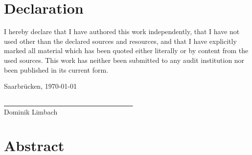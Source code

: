 \documentclass[
    12pt,
    a4paper,
	chapterprefix=false,
	parskip=full,
	headings=normal,
	numbers=noenddot
]{scrreprt}
\begin{document}
%
%	
%	
%	
%

\newpage

\chapter*{Declaration}

I hereby declare that I have authored this work independently, that I have not used other than the declared sources and resources, and that I have explicitly marked all material which has been quoted either literally or by content from the used sources. This work has neither been submitted to any audit institution nor been published in its current form.\\

\vspace{1cm}

Saarbrücken, \today\\

\vspace{1.5cm}

\underline{~ ~ ~ ~ ~ ~ ~ ~ ~ ~ ~ ~ ~ ~ ~ ~ ~ ~ ~ ~ ~ ~ ~}\\
\small
Dominik Limbach
\normalsize

\thispagestyle{empty}
\clearpage

\newpage

\chapter*{Abstract}
\setcounter{page}{1}
\end{document}
